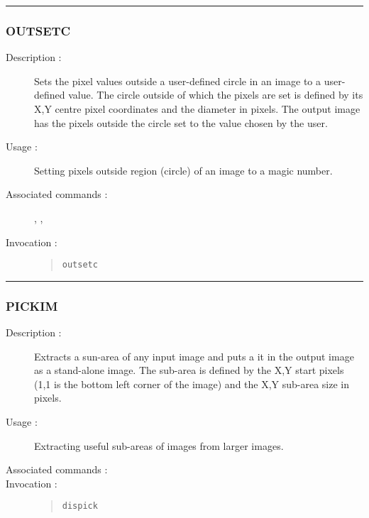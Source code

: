 \hrule
\subsubsection*{\label{OUTSETC}OUTSETC}

\begin{description}

\item[Description :] Sets the pixel values outside a user-defined
circle in an image to a user-defined value.  The circle outside of
which the pixels are set is defined by its X,Y centre pixel coordinates
and the diameter in pixels.  The output image has the pixels outside
the circle set to the value chosen by the user.

\item[Usage :] Setting pixels outside region (circle) of an image to a
magic number.

\item[Associated commands :] {\tt {}},
{\tt {}}, {\tt {}}

\item[Invocation :]

\begin{quote}{\tt  outsetc }\end{quote}

\end{description}

\hrule
\subsubsection*{\label{PICKIM}PICKIM}

\begin{description}

\item[Description :] Extracts a sun-area of any input image and puts a
it in the output image as a stand-alone image.  The sub-area is defined
by the  X,Y start pixels (1,1 is the bottom left corner of the image)
and the X,Y sub-area size in pixels.

\item[Usage :] Extracting useful sub-areas of images from larger images.
\item[Associated commands :] {\tt {}}
\item[Invocation :]

\begin{quote}{\tt dispick }\end{quote}

\end{description}

